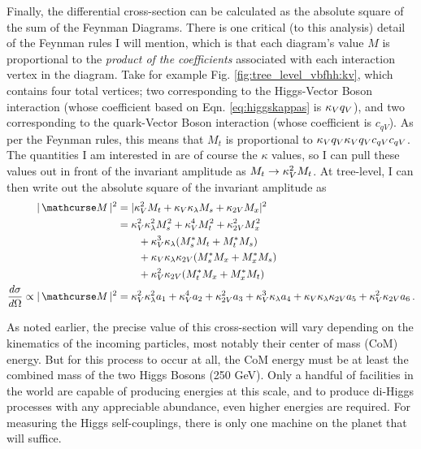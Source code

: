     Finally, the differential cross-section can be calculated as the absolute square of the sum of the Feynman Diagrams.
    There is one critical (to this analysis) detail of the Feynman rules I will mention,
        which is that each diagram's value $M$ is proportional to the \textit{product of the coefficients}
        associated with each interaction vertex in the diagram.
    Take for example Fig. \ref{fig:tree_level_vbfhh:kv}, which contains four total vertices;
        two corresponding to the Higgs-Vector Boson interaction (whose coefficient based on Eqn. \ref{eq:higgskappas} is $\kappa_{V} q_V$),
        and two corresponding to the quark-Vector Boson interaction (whose coefficient is $c_{qV}$).
    As per the Feynman rules, this means that $M_t$ is proportional to $\kappa_{V} q_V \kappa_{V} q_V c_{qV} c_{qV}$.
    The quantities I am interested in are of course the $\kappa$ values,
        so I can pull these values out in front of the invariant amplitude as $M_t \rightarrow \kappa_{V}^2 M_t$.
    At tree-level, I can then write out the absolute square of the invariant amplitude as
    \begin{equation} \begin{split} \label{eq:tree_level_invamp}
        |\invAmp|^2 &= |  \kv^2 M_t + \kv \kl M_s + \kvv M_x |^2
        \\&= \kv^2 \kl^2 M_s^2 + \kv^4 M_t^2 + \kvv^2 M_x^2 
            \\&\qquad + \kv^3 \kl (M_s^* M_t + M_t^* M_s) 
            \\&\qquad + \kv \kl \kvv (M_s^* M_x + M_x^* M_s ) 
            \\&\qquad + \kv^2 \kvv (M_t^* M_x + M_x^* M_t )
        \\\dXsec \propto |\invAmp|^2 &= \kv^2 \kl^2 a_1 + \kv^4 a_2 + \kvv^2 a_3 + \kv^3 \kl a_4 + \kv \kl \kvv a_5 + \kv^2 \kvv a_6
        \,.
    \end{split} \end{equation}

    As noted earlier, the precise value of this cross-section will vary depending on the kinematics of the incoming particles,
        most notably their center of mass (CoM) energy.
    But for this process to occur at all, the CoM energy must be at least the combined mass of the two Higgs Bosons (250 GeV).
    Only a handful of facilities in the world are capable of producing energies at this scale,
        and to produce di-Higgs processes with any appreciable abundance,
        even higher energies are required.
    For measuring the Higgs self-couplings, there is only one machine on the planet that will suffice.
